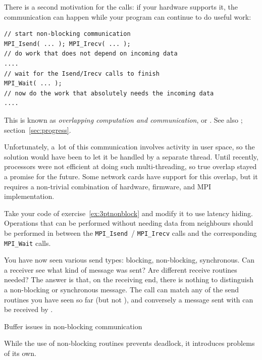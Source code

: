 There is a second motivation for the  calls:
if your hardware supports it, the communication can
happen
while your program can continue to do useful work:
\begin{lstlisting}
// start non-blocking communication
MPI_Isend( ... ); MPI_Irecv( ... );
// do work that does not depend on incoming data
....
// wait for the Isend/Irecv calls to finish
MPI_Wait( ... );
// now do the work that absolutely needs the incoming data
....
\end{lstlisting}
This is known as \emph{overlapping computation and communication}, or
%
.
See also ; section~\ref{sec:progress}.

Unfortunately, a~lot of this
communication involves activity in user space, so the solution would
have been to let it be handled by a separate thread. Until recently,
processors were not efficient at doing such multi-threading, so true
overlap stayed a promise for the future. Some network cards have
support for this overlap, but it requires a non-trivial combination of
hardware, firmware, and MPI implementation.

\begin{exercise}
  \label{ex:3ptnonblock-hide}
  Take your code of exercise~\ref{ex:3ptnonblock} and modify it to use
  latency hiding. Operations that can be performed without needing
  data from neighbours should be performed in between the
  \lstinline{MPI_Isend}~/ \lstinline{MPI_Irecv} calls and the
  corresponding \lstinline{MPI_Wait} calls.
\end{exercise}

\begin{remark}
  You have now seen various send types: blocking, non-blocking, synchronous.
  Can a receiver see what kind of message was sent? Are different receive
  routines needed?
  The answer is that, on the receiving end, there is nothing to distinguish
  a non-blocking or
  synchronous message. The  call can match any of the
  send routines you have seen so far (but not ), and
  conversely a message sent with 
  can be received by .
\end{remark}

 {Buffer issues in non-blocking communication}

While the use of non-blocking routines prevents deadlock, it
introduces problems of its own.

